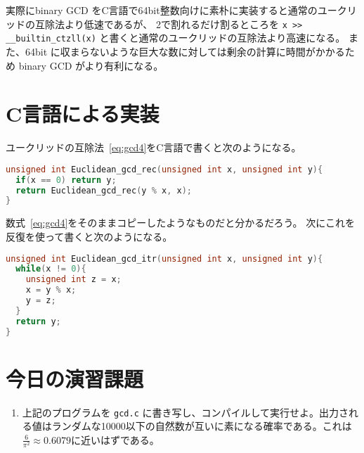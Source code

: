 \documentclass[a4paper,oneside,onecolumn,openany,article,10pt]{memoir}
\theoremstyle{remark}
\begin{document}
実際にbinary GCD をC言語で64bit整数向けに素朴に実装すると通常のユークリッドの互除法より低速であるが、 2で割れるだけ割るところを \texttt{x >{}> \_\_builtin\_ctzll(x)} と書くと通常のユークリッドの互除法より高速になる。
また、64bit に収まらないような巨大な数に対しては剰余の計算に時間がかかるため binary GCD がより有利になる。



\section{C言語による実装}
ユークリッドの互除法~\eqref{eq:gcd4}をC言語で書くと次のようになる。
\begin{lstlisting}[basicstyle=\ttfamily\normalsize,showstringspaces=false,language=C,frame=single]
unsigned int Euclidean_gcd_rec(unsigned int x, unsigned int y){
  if(x == 0) return y;
  return Euclidean_gcd_rec(y % x, x);
}
\end{lstlisting}
数式~\eqref{eq:gcd4}をそのままコピーしたようなものだと分かるだろう。
次にこれを反復を使って書くと次のようになる。
\begin{lstlisting}[basicstyle=\ttfamily\normalsize,showstringspaces=false,language=C,frame=single]
unsigned int Euclidean_gcd_itr(unsigned int x, unsigned int y){
  while(x != 0){
    unsigned int z = x;
    x = y % x;
    y = z;
  }
  return y;
}
\end{lstlisting}

\section{今日の演習課題}
\begin{enumerate}
\item 上記のプログラムを \texttt{gcd.c} に書き写し、コンパイルして実行せよ。出力される値はランダムな10000以下の自然数が互いに素になる確率である。これは$\frac6{\pi^2}\approx 0.6079$に近いはずである。
\end{enumerate}
\end{document}
